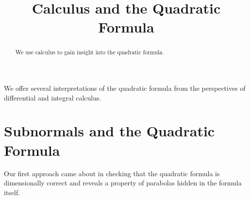 \documentclass{ximera}
\title{Calculus and the Quadratic Formula}
\begin{document}
\begin{abstract}
We use calculus to gain insight into the quadratic formula.
\end{abstract}
\maketitle

 We offer several interpretations of the quadratic formula from the perspectives of differential and integral calculus.

\section*{Subnormals and the Quadratic Formula}
Our first approach came about in checking that the quadratic formula is dimensionally correct and reveals a property of parabolas hidden in the formula itself.


 
 
 
\end{document}
